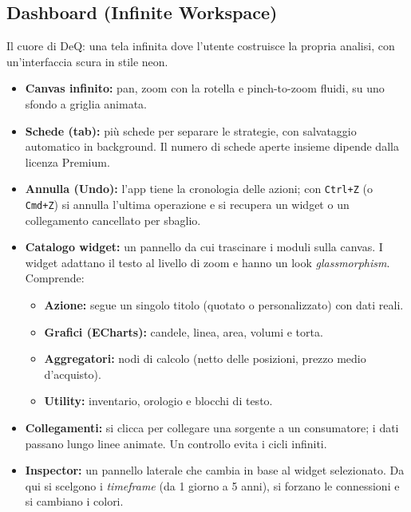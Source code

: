 \subsection{Dashboard (Infinite Workspace)}
Il cuore di DeQ: una tela infinita dove l'utente costruisce la propria analisi, con un'interfaccia scura in stile neon.
\begin{itemize}[itemsep=-2pt]
    \item \textbf{Canvas infinito:} pan, zoom con la rotella e pinch-to-zoom fluidi, su uno sfondo a griglia animata.
    \item \textbf{Schede (tab):} più schede per separare le strategie, con salvataggio automatico in background. Il numero di schede aperte insieme dipende dalla licenza Premium.
    \item \textbf{Annulla (Undo):} l'app tiene la cronologia delle azioni; con \texttt{Ctrl+Z} (o \texttt{Cmd+Z}) si annulla l'ultima operazione e si recupera un widget o un collegamento cancellato per sbaglio.
    \item \textbf{Catalogo widget:} un pannello da cui trascinare i moduli sulla canvas. I widget adattano il testo al livello di zoom e hanno un look \textit{glassmorphism}. Comprende:
    \begin{itemize}
        \item \textbf{Azione:} segue un singolo titolo (quotato o personalizzato) con dati reali.
        \item \textbf{Grafici (ECharts):} candele, linea, area, volumi e torta.
        \item \textbf{Aggregatori:} nodi di calcolo (netto delle posizioni, prezzo medio d'acquisto).
        \item \textbf{Utility:} inventario, orologio e blocchi di testo.
    \end{itemize}
    \item \textbf{Collegamenti:} si clicca per collegare una sorgente a un consumatore; i dati passano lungo linee animate. Un controllo evita i cicli infiniti.
    \item \textbf{Inspector:} un pannello laterale che cambia in base al widget selezionato. Da qui si scelgono i \textit{timeframe} (da 1 giorno a 5 anni), si forzano le connessioni e si cambiano i colori.
\end{itemize}

